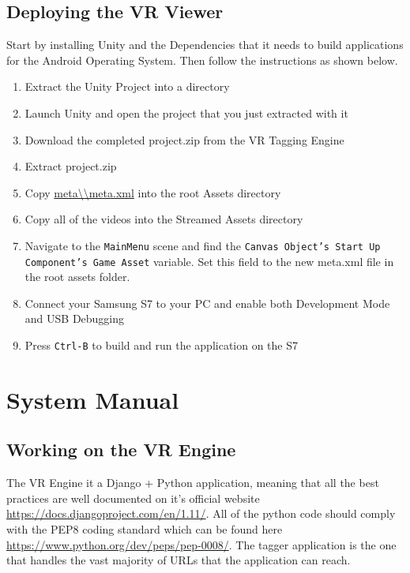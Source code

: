 \documentclass[12pt]{report}
\newcommand{\inlinecode}{\texttt}
\begin{document}
\begin{appendices}
    \section{Deploying the VR Viewer}
    Start by installing Unity and the Dependencies that it needs to build
    applications for the Android Operating System. Then follow the instructions
    as shown below.
    \begin{enumerate}
        \item Extract the Unity Project into a directory
        \item Launch Unity and open the project that you just extracted with it
        \item Download the completed project.zip from the VR Tagging Engine
        \item Extract project.zip
        \item Copy \url{meta\\meta.xml} into the root Assets directory
        \item Copy all of the videos into the Streamed Assets directory
        \item Navigate to the \inlinecode{MainMenu} scene and find the
            \inlinecode{Canvas Object's Start Up Component's Game Asset}
            variable. Set this field to the new meta.xml file in the root
            assets folder.
        \item Connect your Samsung S7 to your PC and enable both Development Mode and USB Debugging
        \item Press \inlinecode{Ctrl-B} to build and run the application on the S7
    \end{enumerate}

    \chapter{System Manual}
    \section{Working on the VR Engine}
    The VR Engine it a Django + Python application, meaning that all the best
    practices are well documented on it's official website
    \url{https://docs.djangoproject.com/en/1.11/}. All of the python code
    should comply with the PEP8 coding standard which can be found here
    \url{https://www.python.org/dev/peps/pep-0008/}. The tagger application is
    the one that handles the vast majority of URLs that the application can
    reach.


\end{appendices}
\end{document}
